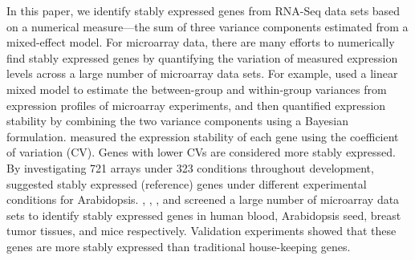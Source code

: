 \documentclass[letterpaper,12pt]{article}
\begin{document}
In this paper, we identify stably expressed genes from RNA-Seq data sets based
on a numerical measure---the sum of three variance components estimated from a
mixed-effect model. 
For microarray data, there are many efforts to numerically find stably
expressed genes by quantifying the variation of measured expression levels
across a large number of microarray data sets.  For example,
\cite{andersen2004normalization} used a linear mixed model to estimate the
between-group and within-group variances from expression profiles of
microarray experiments, and then quantified expression stability by combining
the two variance components using a Bayesian formulation. 
\cite{czechowski2005genome} measured the expression stability of each gene
using the coefficient of variation (CV). Genes with lower CVs are considered
 more stably expressed.  By investigating 721 arrays under 323 conditions
throughout development, \cite{czechowski2005genome} suggested stably expressed
(reference) genes under different experimental conditions for Arabidopsis.
\cite{stamova2009identification},  \citet{dekkers2012identification}, \citet{gur2009identification}, and
 \citet{frericks2008toolbox} screened a large number of microarray data sets
 to identify stably expressed genes in human blood, Arabidopsis seed, breast tumor tissues,
 and mice respectively.
Validation experiments \citep{czechowski2005genome,
dekkers2012identification, huggett2005real,stamova2009identification} showed
that these genes are more stably expressed than traditional house-keeping
genes.  

\end{document}
